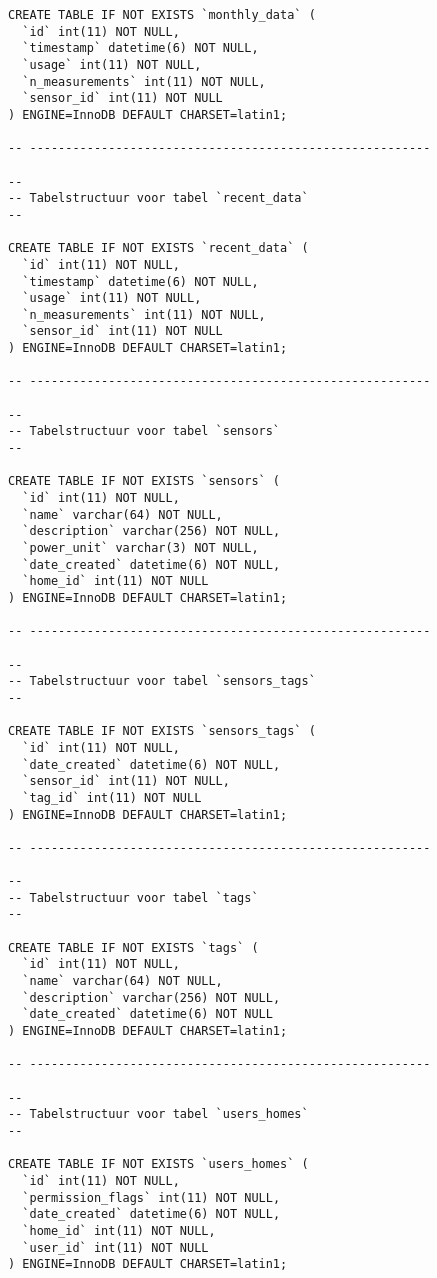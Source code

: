 \documentclass[11pt]{article}
\begin{document}
\begin{lstlisting}[style=SQL]
CREATE TABLE IF NOT EXISTS `monthly_data` (
  `id` int(11) NOT NULL,
  `timestamp` datetime(6) NOT NULL,
  `usage` int(11) NOT NULL,
  `n_measurements` int(11) NOT NULL,
  `sensor_id` int(11) NOT NULL
) ENGINE=InnoDB DEFAULT CHARSET=latin1;

-- --------------------------------------------------------

--
-- Tabelstructuur voor tabel `recent_data`
--

CREATE TABLE IF NOT EXISTS `recent_data` (
  `id` int(11) NOT NULL,
  `timestamp` datetime(6) NOT NULL,
  `usage` int(11) NOT NULL,
  `n_measurements` int(11) NOT NULL,
  `sensor_id` int(11) NOT NULL
) ENGINE=InnoDB DEFAULT CHARSET=latin1;

-- --------------------------------------------------------

--
-- Tabelstructuur voor tabel `sensors`
--

CREATE TABLE IF NOT EXISTS `sensors` (
  `id` int(11) NOT NULL,
  `name` varchar(64) NOT NULL,
  `description` varchar(256) NOT NULL,
  `power_unit` varchar(3) NOT NULL,
  `date_created` datetime(6) NOT NULL,
  `home_id` int(11) NOT NULL
) ENGINE=InnoDB DEFAULT CHARSET=latin1;

-- --------------------------------------------------------

--
-- Tabelstructuur voor tabel `sensors_tags`
--

CREATE TABLE IF NOT EXISTS `sensors_tags` (
  `id` int(11) NOT NULL,
  `date_created` datetime(6) NOT NULL,
  `sensor_id` int(11) NOT NULL,
  `tag_id` int(11) NOT NULL
) ENGINE=InnoDB DEFAULT CHARSET=latin1;

-- --------------------------------------------------------

--
-- Tabelstructuur voor tabel `tags`
--

CREATE TABLE IF NOT EXISTS `tags` (
  `id` int(11) NOT NULL,
  `name` varchar(64) NOT NULL,
  `description` varchar(256) NOT NULL,
  `date_created` datetime(6) NOT NULL
) ENGINE=InnoDB DEFAULT CHARSET=latin1;

-- --------------------------------------------------------

--
-- Tabelstructuur voor tabel `users_homes`
--

CREATE TABLE IF NOT EXISTS `users_homes` (
  `id` int(11) NOT NULL,
  `permission_flags` int(11) NOT NULL,
  `date_created` datetime(6) NOT NULL,
  `home_id` int(11) NOT NULL,
  `user_id` int(11) NOT NULL
) ENGINE=InnoDB DEFAULT CHARSET=latin1;


\end{lstlisting}
\end{document}
